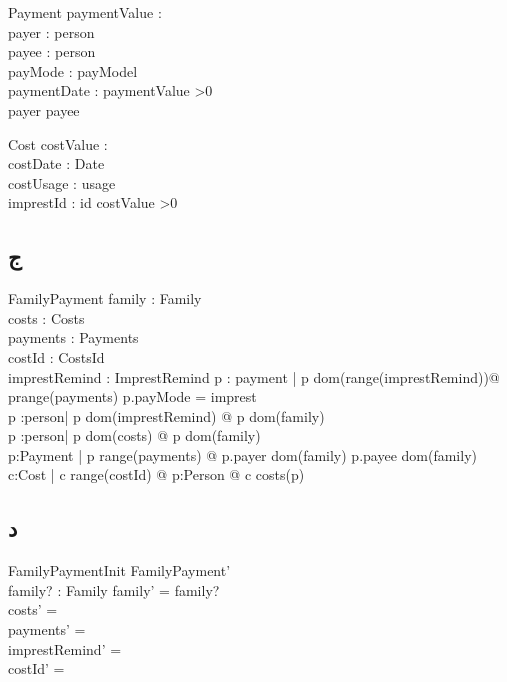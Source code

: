 \documentclass{article}
\begin{document}
\begin{schema}{Payment}
paymentValue : \nat\\
payer : person\\
payee : person\\
payMode : payModel\\
paymentDate : \nat \cross \nat \cross \nat
\where
paymentValue >0\\
payer \neq payee
\end{schema}

\begin{schema}{Cost}
costValue : \nat\\
costDate : Date\\
costUsage : usage\\
imprestId : id
\where
costValue >0
\end{schema}

\subsection*{ج}

\begin{schema}{FamilyPayment}
family : Family\\
costs : Costs\\
payments : Payments\\
costId : CostsId\\ 
imprestRemind : ImprestRemind
\where
\forall p : payment | p \in dom(range(imprestRemind))@ p\in range(payments) \land p.payMode = imprest\\
\forall p :person| p \in dom(imprestRemind) @ p \in dom(family)\\
\forall p :person| p \in dom(costs) @ p \in dom(family)\\
\forall p:Payment | p \in range(payments) @ p.payer \in dom(family) \land p.payee \in dom(family)\\
\forall c:Cost | c \in range(costId) @ \exists p:Person @ c \in costs(p)
\end{schema}

\subsection*{د}
\begin{schema}{FamilyPaymentInit}
FamilyPayment'\\
family? : Family
\where
family' = family?\\
costs' = \emptyset\\
payments' = \emptyset\\
imprestRemind' = \emptyset\\
costId' = \emptyset
\end{schema}
\end{document}
